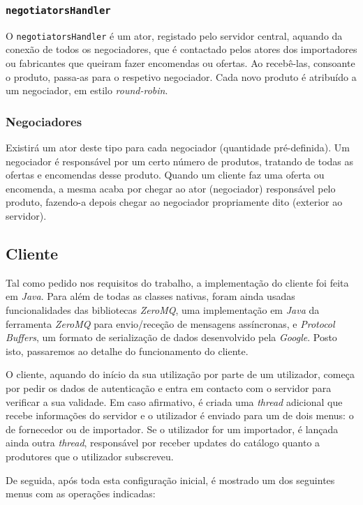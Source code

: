 \documentclass[a4paper]{report}
\begin{document}
	\subsubsection{\texttt{negotiatorsHandler}}
	O \texttt{negotiatorsHandler} é um ator, registado pelo servidor central, aquando da conexão de todos os negociadores, que é contactado pelos atores dos importadores ou fabricantes que queiram fazer encomendas ou ofertas. 
	Ao recebê-las, consoante o produto, passa-as para o respetivo negociador. Cada novo produto é atribuído a um negociador, em estilo \textit{round-robin}.

	\subsubsection{Negociadores}
	Existirá um ator deste tipo para cada negociador (quantidade pré-definida). Um negociador é responsável por um certo número de produtos, tratando de todas as ofertas e encomendas desse produto.
	Quando um cliente faz uma oferta ou encomenda, a mesma acaba por chegar ao ator (negociador) responsável pelo produto, fazendo-a depois chegar ao negociador propriamente dito (exterior ao servidor).

	\subsection{Cliente}
	Tal como pedido nos requisitos do trabalho, a implementação do cliente foi feita em \textit{Java}. Para além de todas as classes nativas, foram ainda usadas funcionalidades das bibliotecas \textit{ZeroMQ}, uma implementação em \textit{Java} da ferramenta \textit{ZeroMQ} para envio/receção de mensagens assíncronas, e \textit{Protocol Buffers}, um formato de serialização de dados desenvolvido pela \textit{Google}. Posto isto, passaremos ao detalhe do funcionamento do cliente.
	
	O cliente, aquando do início da sua utilização por parte de um utilizador, começa por pedir os dados de autenticação e entra em contacto com o servidor para verificar a sua validade. Em caso afirmativo, é criada uma \textit{thread} adicional que recebe informações do servidor e o utilizador é enviado para um de dois menus: o de fornecedor ou de importador. Se o utilizador for um importador, é lançada ainda outra \textit{thread}, responsável por receber updates do catálogo quanto a produtores que o utilizador subscreveu.
	
	De seguida, após toda esta configuração inicial, é mostrado um dos seguintes menus com as operações indicadas:
	
\end{document}

